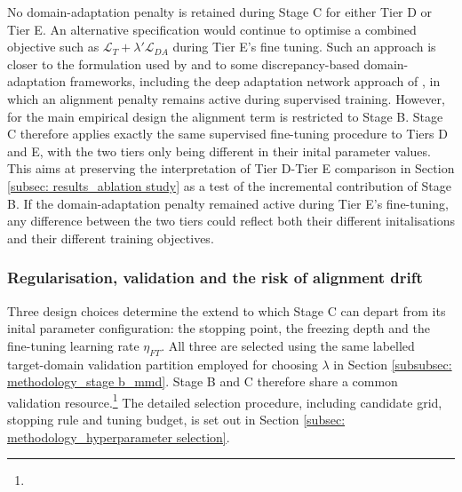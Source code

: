 No domain-adaptation penalty is retained during Stage C for either Tier D or Tier E. An alternative specification would continue to optimise a combined objective such as $\mathcal L _T + \lambda' \mathcal{L}_{DA}$ during Tier E's fine tuning. Such an approach is closer to the formulation used by \textcite{mashettyTransferLearningCrossMarket2025a} and to some discrepancy-based domain-adaptation frameworks, including the deep adaptation network approach of \textcite{longLearningTransferableFeatures2015}, in which an alignment penalty remains active during supervised training. However, for the main empirical design the alignment term is restricted to Stage B. Stage C therefore applies exactly the same supervised fine-tuning procedure to Tiers D and E, with the two tiers only being different in their inital parameter values. This aims at preserving the interpretation of Tier D-Tier E comparison in Section \ref{subsec: results_ablation study} as a test of the incremental contribution of Stage B. If the domain-adaptation penalty remained active during Tier E's fine-tuning, any difference between the two tiers could reflect both their different initalisations and their different training objectives.

\subsubsection{Regularisation, validation and the risk of alignment drift} \label{subsubsec: methodology_stage c_regularisation, validation and the risk of alignment drift}
Three design choices determine the extend to which Stage C can depart from its inital parameter configuration: the stopping point, the freezing depth and the fine-tuning learning rate $\eta_{FT}$. All three are selected using the same labelled target-domain validation partition employed for choosing $\lambda$ in Section \ref{subsubsec: methodology_stage b_mmd}. Stage B and C therefore share a common validation resource.\footnote{} The detailed selection procedure, including candidate grid, stopping rule and tuning budget, is set out in Section \ref{subsec: methodology_hyperparameter selection}. 

